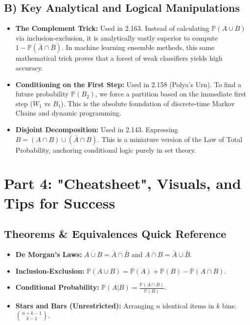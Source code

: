 \documentclass[11pt]{article}
\theoremstyle{definition}
\theoremstyle{remark}
\newcommand{\Prob}{\mathbb{P}}
\begin{document}
\subsection{B) Key Analytical and Logical Manipulations}
\begin{itemize}
    \item \textbf{The Complement Trick:} Used in 2.163. Instead of calculating $\Prob(A \cup B)$ via inclusion-exclusion, it is analytically vastly superior to compute $1 - \Prob(\bar{A}\cap\bar{B})$. In machine learning ensemble methods, this same mathematical trick proves that a forest of weak classifiers yields high accuracy.
    \item \textbf{Conditioning on the First Step:} Used in 2.158 (Polya's Urn). To find a future probability $\Prob(B_2)$, we force a partition based on the immediate first step ($W_1$ vs $B_1$). This is the absolute foundation of discrete-time Markov Chains and dynamic programming.
    \item \textbf{Disjoint Decomposition:} Used in 2.143. Expressing $B = (A \cap B) \cup (\bar{A} \cap B)$. This is a miniature version of the Law of Total Probability, anchoring conditional logic purely in set theory.
\end{itemize}

\newpage
\section{Part 4: "Cheatsheet", Visuals, and Tips for Success}

\subsection{Theorems \& Equivalences Quick Reference}
\begin{itemize}
    \item \textbf{De Morgan's Laws:} $\overline{A \cup B} = \bar{A} \cap \bar{B}$ and $\overline{A \cap B} = \bar{A} \cup \bar{B}$.
    \item \textbf{Inclusion-Exclusion:} $\Prob(A \cup B) = \Prob(A) + \Prob(B) - \Prob(A \cap B)$.
    \item \textbf{Conditional Probability:} $\Prob(A|B) = \frac{\Prob(A \cap B)}{\Prob(B)}$.
    \item \textbf{Stars and Bars (Unrestricted):} Arranging $n$ identical items in $k$ bins: $\binom{n+k-1}{k-1}$.
\end{itemize}
\end{document}
